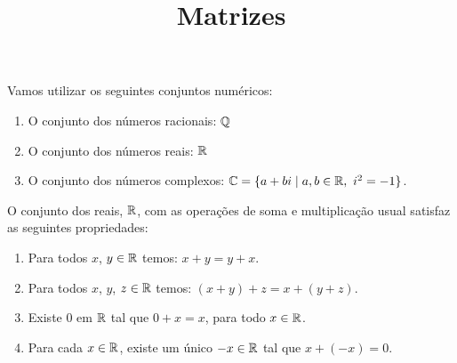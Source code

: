 \documentclass{beamer}
\title{Matrizes}
\author[\autor]{\autor}
\date{}
\begin{document}
    \begin{frame}
        \maketitle
    \end{frame}


    \begin{frame}

        \begin{observacao}
            Vamos utilizar os seguintes conjuntos numéricos:
            \begin{enumerate}[label={\arabic*})]
                \item O conjunto dos números racionais: $\mathbb{Q}$

                \item O conjunto dos números reais: $\mathbb{R}$

                \item O conjunto dos números complexos: $\mathbb{C} = \{a + bi \mid a, b \in \mathbb{R},\ i^2 = -1\}$.
            \end{enumerate}
        \end{observacao}

        \begin{teorema}
            O conjunto dos reais, $\mathbb{R}$, com as operações de soma e multiplicação usual satisfaz as seguintes propriedades:
            \begin{enumerate}[label={\roman*})]
                \seti
                \item Para todos $x$, $y \in \mathbb{R}$ temos: $x + y = y + x$.

                \item Para todos $x$, $y$, $z \in \mathbb{R}$ temos: $(x + y) + z = x + (y + z)$.

                \item Existe 0 em $\mathbb{R}$ tal que $0 + x = x$, para todo $x \in \mathbb{R}$.

                \item Para cada $x \in \mathbb{R}$, existe um único $-x \in \mathbb{R}$ tal que
                    $x + (-x) = 0$.
            \end{enumerate}
        \end{teorema}
    \end{frame}
\end{document}
